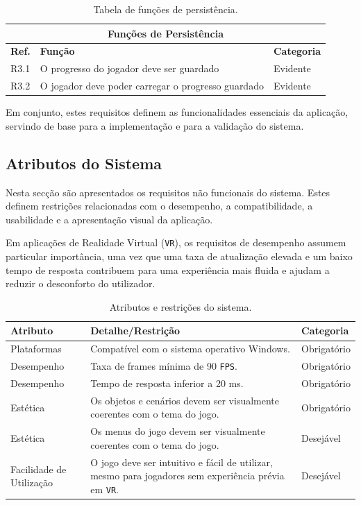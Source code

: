\documentclass[a4paper, 12pt]{book}
\begin{document}
\begin{table}[H]
    \centering
    \begin{tabular}{|l|p{9cm}|l|}
        \hline
        \multicolumn{3}{|c|}{\textbf{Funções de Persistência}} \\ \hline
        \textbf{Ref.} & \textbf{Função} & \textbf{Categoria} \\ \hline
        R3.1 & O progresso do jogador deve ser guardado & Evidente \\ \hline
        R3.2 & O jogador deve poder carregar o progresso guardado & Evidente \\ \hline
    \end{tabular}
    \caption{Tabela de funções de persistência.}
    \label{tab:persistencia}
\end{table}

Em conjunto, estes requisitos definem as funcionalidades essenciais da aplicação,
servindo de base para a implementação e para a validação do sistema.

\subsection{Atributos do Sistema}\label{ssec:atributos}
Nesta secção são apresentados os requisitos não funcionais do sistema. Estes
definem restrições relacionadas com o desempenho, a compatibilidade, a
usabilidade e a apresentação visual da aplicação.

Em aplicações de Realidade Virtual (\texttt{VR}), os requisitos de desempenho
assumem particular importância, uma vez que uma taxa de atualização elevada e um
baixo tempo de resposta contribuem para uma experiência mais fluida e ajudam a
reduzir o desconforto do utilizador.

\begin{table}[H]
    \centering
    \begin{tabular}{|p{3.2cm}|p{8.5cm}|p{2.5cm}|}
        \hline
        \textbf{Atributo} & \textbf{Detalhe/Restrição} & \textbf{Categoria} \\ \hline
        Plataformas & Compatível com o sistema operativo Windows. & Obrigatório \\ \hline
        Desempenho & Taxa de frames mínima de 90 \texttt{FPS}. & Obrigatório \\ \hline
        Desempenho & Tempo de resposta inferior a 20 ms. & Obrigatório \\ \hline
        Estética & Os objetos e cenários devem ser visualmente coerentes com o tema do jogo. & Obrigatório \\ \hline
        Estética & Os menus do jogo devem ser visualmente coerentes com o tema do jogo. & Desejável \\ \hline
        Facilidade de Utilização & O jogo deve ser intuitivo e fácil de utilizar, mesmo para jogadores sem experiência prévia em \texttt{VR}. & Desejável \\ \hline
    \end{tabular}
    \caption{Atributos e restrições do sistema.}
    \label{tab:atributos}
\end{table}
\end{document}
